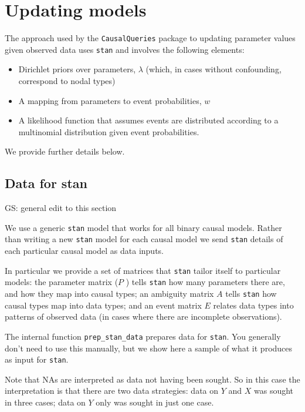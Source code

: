 \documentclass[
  11pt,
  article]{jss}
\providecommand{\tightlist}{%
  \setlength{\itemsep}{0pt}\setlength{\parskip}{0pt}}\usepackage{longtable,booktabs,array}
\begin{document}
\hypertarget{updating-models}{%
\section{Updating models}\label{updating-models}}

The approach used by the \texttt{CausalQueries} package to updating
parameter values given observed data uses \texttt{stan} and involves the
following elements:

\begin{itemize}
\tightlist
\item
  Dirichlet priors over parameters, \(\lambda\) (which, in cases without
  confounding, correspond to nodal types)
\item
  A mapping from parameters to event probabilities, \(w\)
\item
  A likelihood function that assumes events are distributed according to
  a multinomial distribution given event probabilities.
\end{itemize}

We provide further details below.

\hypertarget{data-for-stan}{%
\subsection{Data for stan}\label{data-for-stan}}

GS: general edit to this section

We use a generic \texttt{stan} model that works for all binary causal
models. Rather than writing a new \texttt{stan} model for each causal
model we send \texttt{stan} details of each particular causal model as
data inputs.

In particular we provide a set of matrices that \texttt{stan} tailor
itself to particular models: the parameter matrix (\(P\) ) tells
\texttt{stan} how many parameters there are, and how they map into
causal types; an ambiguity matrix \(A\) tells \texttt{stan} how causal
types map into data types; and an event matrix \(E\) relates data types
into patterns of observed data (in cases where there are incomplete
observations).

The internal function \texttt{prep\_stan\_data} prepares data for
\texttt{stan}. You generally don't need to use this manually, but we
show here a sample of what it produces as input for \texttt{stan}.

Note that NAs are interpreted as data not having been sought. So in this
case the interpretation is that there are two data strategies: data on
\(Y\) and \(X\) was sought in three cases; data on \(Y\) only was sought
in just one case.
\end{document}
